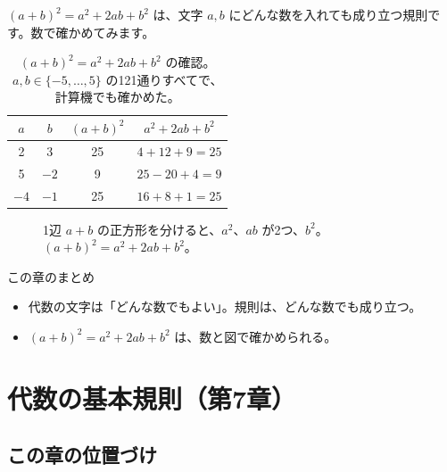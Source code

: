 \documentclass[a4paper,11pt,openany]{ltjsbook}
\begin{document}
$(a+b)^2=a^2+2ab+b^2$ は、文字 $a,b$ にどんな数を入れても成り立つ規則です。数で確かめてみます。

\begin{table}[htbp]
\centering
\begin{tabular}{cc|cc}
\toprule
$a$ & $b$ & $(a+b)^2$ & $a^2+2ab+b^2$\\
\midrule
2 & 3 & 25 & $4+12+9=25$\\
5 & $-2$ & 9 & $25-20+4=9$\\
$-4$ & $-1$ & 25 & $16+8+1=25$\\
\bottomrule
\end{tabular}
\caption{$(a+b)^2=a^2+2ab+b^2$ の確認。$a,b\in\{-5,\ldots,5\}$ の121通りすべてで、計算機でも確かめた。}
\end{table}

\begin{figure}[htbp]
\centering
{}
\caption{1辺 $a+b$ の正方形を分けると、$a^2$、$ab$ が2つ、$b^2$。$(a+b)^2=a^2+2ab+b^2$。}
\end{figure}

\begin{pointbox}{この章のまとめ}
\begin{itemize}[leftmargin=*]
\item 代数の文字は「どんな数でもよい」。規則は、どんな数でも成り立つ。
\item $(a+b)^2=a^2+2ab+b^2$ は、数と図で確かめられる。
\end{itemize}
\end{pointbox}

\chapter{代数の基本規則（第7章）}

\section{この章の位置づけ}
\end{document}
